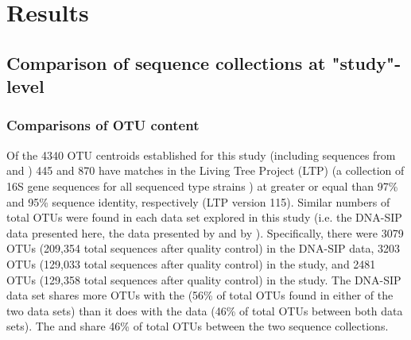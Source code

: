 \section{Results}

\subsection{Comparison of sequence collections at "study"-level}

\subsubsection{Comparisons of OTU content}
Of the 4340 OTU centroids established for this study (including sequences from \citet{Steven_2013} and \cite{Garcia_Pichel_2013}) 445 and 870 have matches in the Living Tree Project (LTP) (a collection of 16S gene sequences for all sequenced type strains \cite{Yarza_2008}) at greater or equal than 97\% and 95\% sequence identity, respectively (LTP version 115). Similar numbers of total OTUs were found in each data set explored in this study (i.e. the DNA-SIP data presented here, the data presented by \citet{Steven_2013} and by \citet{Garcia_Pichel_2013}). Specifically, there were 3079 OTUs (209,354 total sequences after quality control) in the DNA-SIP data, 3203 OTUs (129,033 total sequences after quality control) in the \citet{Garcia_Pichel_2013} study, and 2481 OTUs (129,358 total sequences after quality control) in the \citet{Steven_2013} study. The DNA-SIP data set shares more OTUs with the \citet{Steven_2013} (56\% of total OTUs found in either of the two data sets) than it does with the \citet{Garcia_Pichel_2013} data (46\% of total OTUs between both data sets). The \cite{Steven_2013} and \cite{Garcia_Pichel_2013} share 46\% of total OTUs between the two sequence collections.

